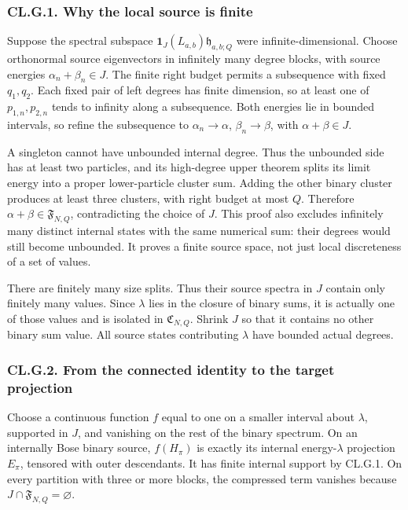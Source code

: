 \documentclass[a4paper,11pt]{article}
\numberwithin{equation}{section}
\begin{document}
\hypertarget{cl.g.1.-why-the-local-source-is-finite}{%
\subsubsection{CL.G.1. Why the local source is finite}\label{cl.g.1.-why-the-local-source-is-finite}}

Suppose the spectral subspace \(\mathbf1_J(L_{a,b})\mathfrak h_{a,b;Q}\) were infinite-dimensional. Choose orthonormal source eigenvectors in infinitely many degree blocks, with source energies \(\alpha_n+\beta_n\in J\). The finite right budget permits a subsequence with fixed \(q_1,q_2\). Each fixed pair of left degrees has finite dimension, so at least one of \(p_{1,n},p_{2,n}\) tends to infinity along a subsequence. Both energies lie in bounded intervals, so refine the subsequence to \(\alpha_n\to\alpha\), \(\beta_n\to\beta\), with \(\alpha+\beta\in J\).

A singleton cannot have unbounded internal degree. Thus the unbounded side has at least two particles, and its high-degree upper theorem splits its limit energy into a proper lower-particle cluster sum. Adding the other binary cluster produces at least three clusters, with right budget at most \(Q\). Therefore \(\alpha+\beta\in\mathfrak F_{N,Q}\), contradicting the choice of \(J\). This proof also excludes infinitely many distinct internal states with the same numerical sum: their degrees would still become unbounded. It proves a finite source space, not just local discreteness of a set of values.

There are finitely many size splits. Thus their source spectra in \(J\) contain only finitely many values. Since \(\lambda\) lies in the closure of binary sums, it is actually one of those values and is isolated in \(\mathfrak C_{N,Q}\). Shrink \(J\) so that it contains no other binary sum value. All source states contributing \(\lambda\) have bounded actual degrees.

\hypertarget{cl.g.2.-from-the-connected-identity-to-the-target-projection}{%
\subsubsection{CL.G.2. From the connected identity to the target projection}\label{cl.g.2.-from-the-connected-identity-to-the-target-projection}}

Choose a continuous function \(f\) equal to one on a smaller interval about \(\lambda\), supported in \(J\), and vanishing on the rest of the binary spectrum. On an internally Bose binary source, \(f(H_\pi)\) is exactly its internal energy-\(\lambda\) projection \(E_\pi\), tensored with outer descendants. It has finite internal support by CL.G.1. On every partition with three or more blocks, the compressed term vanishes because \(J\cap\mathfrak F_{N,Q}=\varnothing\).
\end{document}
